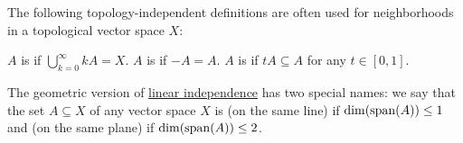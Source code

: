 \begin{definition}\label{def:neighborhood_set_types}
  The following topology-independent definitions are often used for neighborhoods in a topological vector space \( X \):

  \begin{thmenum}
     \( A \) is  if \( \bigcup_{k=0}^\infty kA = X \).
     \( A \) is  if \( -A = A \).
     \( A \) is  if \( tA \subseteq A \) for any \( t \in [0, 1] \).
  \end{thmenum}
\end{definition}

\begin{definition}\label{def:collinear_complanar}
  The geometric version of \hyperref[def:linear_dependence]{linear independence} has two special names: we say that the set \( A \subseteq X \) of any vector space \( X \) is  (on the same line) if \( \dim(\operatorname{span}(A)) \leq 1 \) and  (on the same plane) if \( \dim(\operatorname{span}(A)) \leq 2 \).
\end{definition}
